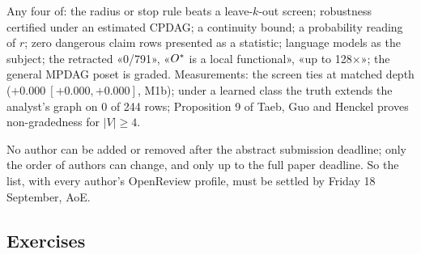 %
{Any four of: the radius or stop rule beats a leave-$k$-out screen; robustness certified under an estimated
CPDAG; a continuity bound; a probability reading of $r$; zero dangerous claim rows presented as a statistic;
language models as the subject; the retracted «0/791», «$O^{*}$ is a local functional», «up to 128×»; the
general MPDAG poset is graded. Measurements: the screen ties at matched depth ($+0.000\ [+0.000, +0.000]$,
M1b); under a learned class the truth extends the analyst's graph on 0 of 244 rows; Proposition 9 of Taeb,
Guo and Henckel proves non-gradedness for $|V| \ge 4$.}

%
{No author can be added or removed after the abstract submission deadline; only the order of authors can
change, and only up to the full paper deadline. So the list, with every author's OpenReview profile, must
be settled by Friday 18 September, AoE.}


\subsection*{Exercises}


